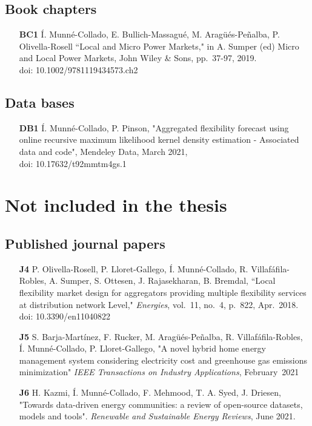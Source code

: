 \subsection*{Book chapters}

\begin{itemize}
	\item[\textbf{BC1}] \'{I}. Munn\'{e}-Collado, E. Bullich-Massagu\'{e}, M. Arag\"{u}\'{e}s-Pe\~{n}alba, P. Olivella-Rosell ``Local and Micro Power Markets," in A. Sumper (ed) Micro and Local Power Markets, John Wiley \& Sons, pp.~37-97, 2019. \\doi: 10.1002/9781119434573.ch2
\end{itemize}

\subsection*{Data bases}

\begin{itemize}
	\item [\textbf{DB1}] \'{I}. Munn\'{e}-Collado, P. Pinson, "Aggregated flexibility forecast using online recursive maximum likelihood kernel density estimation - Associated data and code", Mendeley Data, March 2021,  \\doi: 10.17632/t92mmtm4gs.1
\end{itemize}

\section*{Not included in the thesis}

\subsection*{Published journal papers}

\begin{itemize}
	
		\item [\textbf{J4}] P. Olivella-Rosell, P. Lloret-Gallego, \'{I}. Munn\'{e}-Collado, R. Villaf\'{a}fila-Robles, A. Sumper, S. Ottesen, J. Rajasekharan, B. Bremdal, ``Local flexibility market design for aggregators providing multiple flexibility services at distribution network Level," \textit{Energies}, vol.~11, no.~4, p.~822, Apr.~2018. doi: 10.3390/en11040822
	\item [\textbf{J5}]  S. Barja-Mart\'{i}nez, F. Rucker, M. Arag\"{u}\'{e}s-Pe\~{n}alba, R. Villaf\'{a}fila-Robles, \'{I}. Munn\'{e}-Collado, P. Lloret-Gallego, "A novel hybrid home energy management system considering electricity cost and greenhouse gas emissions minimization" \textit{IEEE Transactions on Industry Applications}, February~2021
	\item [\textbf{J6}] H. Kazmi, \'{I}. Munn\'{e}-Collado, F. Mehmood, T. A. Syed, J. Driesen, "Towards data-driven energy communities: a review of open-source datasets, models and tools". \textit{Renewable and Sustainable Energy Reviews}, June 2021.
\end{itemize}

